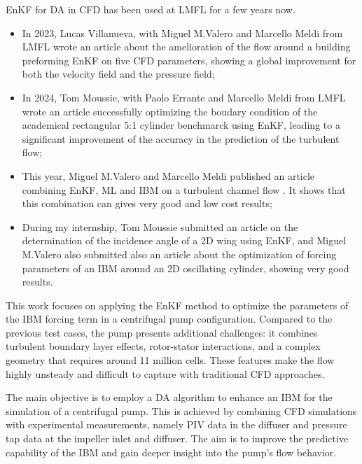 EnKF for DA in CFD has been used at \ac{LMFL} for a few years now.
\begin{itemize}
    \item In 2023, Lucas Villanueva, with Miguel M.Valero and Marcello Meldi from LMFL wrote an article\cite{villanuevaAugmentedStateEstimation2023} about the amelioration of the flow around a building preforming EnKF on five CFD parameters, showing a global improvement for both the velocity field and the pressure field;
    \item In 2024, Tom Moussie, with Paolo Errante and Marcello Meldi from LMFL wrote an article\cite{moussieStatisticalInferenceUpstream2024a} successfully optimizing the boudary condition of the academical rectangular 5:1 cylinder benchmarck using EnKF, leading to a significant improvement of the accuracy in the prediction of the turbulent flow;
    \item This year, Miguel M.Valero and Marcello Meldi published an article combining EnKF, \ac{ML} and IBM on a turbulent channel flow \cite{valeroEnhancedStateEstimation2025}. It shows that this combination can gives very good and low cost results;
    \item During my internship, Tom Moussie submitted an article on the determination of the incidence angle of a 2D wing using EnKF, and Miguel M.Valero also submitted also an article about the optimization of forcing parameters of an IBM around an 2D oscillating cylinder, showing very good results.
\end{itemize}








\newpage

This work focuses on applying the EnKF method to optimize the parameters of the IBM forcing term in a centrifugal pump configuration. Compared to the previous test cases, the pump presents additional challenges: it combines turbulent boundary layer effects, rotor-stator interactions, and a complex geometry that requires around 11 million cells. These features make the flow highly unsteady and difficult to capture with traditional CFD approaches.

The main objective is to employ a DA algorithm to enhance an IBM for the simulation of a centrifugal pump. %
This is achieved by combining CFD simulations with experimental measurements, namely PIV data in the diffuser and pressure tap data at the impeller inlet and diffuser. The aim is to improve the predictive capability of the IBM and gain deeper insight into the pump's flow behavior.

